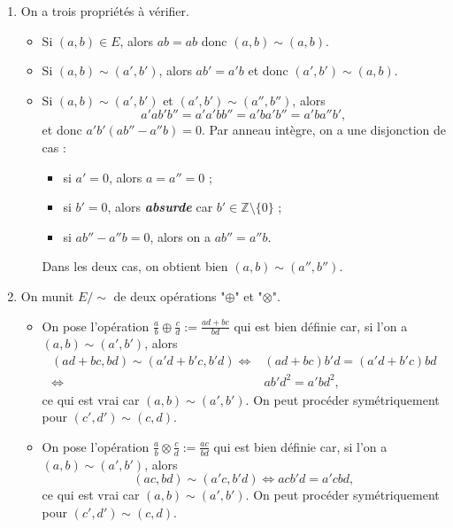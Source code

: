\documentclass[./main]{subfiles}
\begin{document}
  \begin{enumerate}
    \item On a trois propriétés à vérifier.
      \begin{itemize}
        \item Si $(a,b)\in E$, alors $a b = a b$ donc  $(a,b) \sim (a,b)$.
        \item Si  $(a,b)\sim(a',b')$, alors  $a b' = a' b$ et donc  $(a',b')\sim(a,b)$.
        \item Si  $(a,b)\sim(a',b')$ et  $(a',b')\sim(a'',b'')$, alors  \[
            a' a b' b'' = a' a' b b'' = a' b a' b'' = a' b a'' b'
          ,\] et donc $a' b' (a b'' - a'' b) = 0$.
          Par anneau intègre, on a une disjonction de cas :
          \begin{itemize}
            \item si $a' = 0$, alors $a = a'' = 0$ ;
            \item si $b' = 0$, alors \textit{\textbf{absurde}} car $b' \in \mathds{Z} \setminus \{0\}$ ;
            \item si $a b'' - a'' b = 0$, alors on a  $a b'' = a'' b$.
          \end{itemize}
          Dans les deux cas, on obtient bien $(a,b) \sim (a'', b'')$.
      \end{itemize}
    \item On munit $E / {\sim}$ de deux opérations "$\oplus$" et "$\otimes$".
      \begin{itemize}
        \item On pose l'opération $\tfrac{a}{b} \oplus \tfrac{c}{d} := \tfrac{a d + b c}{bd}$ qui est bien définie car, si l'on a~$(a,b)\sim(a',b') $, alors
          \begin{align*}
            (a d + bc, bd) \sim (a' d + b' c, b' d)
            \iff& (a d + bc) b' d = (a ' d + b' c) b d\\
            \iff& a b' d^2 = a' b d^2
          ,\end{align*}
          ce qui est vrai car $(a,b) \sim (a',b')$.
          On peut procéder symétriquement pour $(c',d') \sim (c,d)$. 
        \item On pose l'opération $\tfrac{a}{b} \otimes \tfrac{c}{d} := \tfrac{ac}{bd}$ qui est bien définie car, si l'on a $(a,b) \sim (a', b')$, alors \[
            (ac,bd) \sim (a'c,b'd) \iff a c b' d = a' c b d
          ,\] ce qui est vrai car $(a,b) \sim (a',b')$.
          On peut procéder symétriquement pour $(c',d') \sim (c,d)$. 
      \end{itemize}

\end{enumerate}
\end{document}
